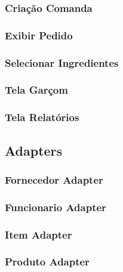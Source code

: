 \subsubsection{Criação Comanda}

\subsubsection{Exibir Pedido}

\subsubsection{Selecionar Ingredientes}

\subsubsection{Tela Garçom}

\subsubsection{Tela Relatórios}
%


\subsection{Adapters}

\subsubsection{Fornecedor Adapter}

\subsubsection{Funcionario Adapter}

\subsubsection{Item Adapter}

\subsubsection{Produto Adapter}


